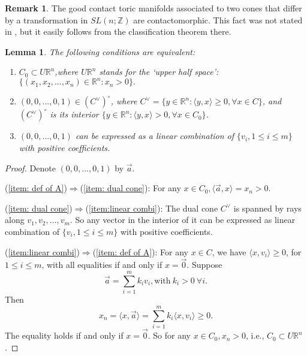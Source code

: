 \documentclass[12pt]{amsart}
\newtheorem{lemma}[theorem]{Lemma}
\theoremstyle{definition}
\newtheorem{remark}[theorem]{Remark}
\numberwithin{equation}{section}
\begin{document}
\begin{remark}
The good contact toric manifolds associated to two cones that differ
by a transformation in $SL(n;{{\mathbb{Z}}})$ are contactomorphic. This fact was
not stated in \cite{L:contact toric}, but it easily follows from the
classification theorem there.
\end{remark}

\begin{lemma}\label{lemma:equiva of Assu A}
The following conditions are equivalent: \begin{enumerate}
\item\label{item: def of A} $C_{0}\subset U{{\mathbb{R}}}^n$,where $U{{\mathbb{R}}}^n$ stands for the `upper half space': $\{(x_{1},x_{2},...,x_{n})\in
{{\mathbb{R}}}^n:x_{n}>0\}.$
\item\label{item: dual cone} $(0,0,...,0,1)\in (C^{\vee})^{\circ}$, where $C^{\vee}=\{y\in {{\mathbb{R}}}^n: \langle y, x\rangle \geq 0, \forall x\in
C\}$, and $(C^{\vee})^{\circ}$ is its interior $\{y\in {{\mathbb{R}}}^n: \langle
y, x\rangle > 0, \forall x\in C_{0}\}$.
\item\label{item:linear combi} $(0,0,...,0,1)$ can be expressed as a linear combination of $\{v_{i},1\leq i\leq
m\}$ with positive coefficients.
\end{enumerate}
\end{lemma}
\begin{proof}
Denote $(0,0,...,0,1)$ by $\vec{a}$.

(\ref{item: def of A})$\Rightarrow$(\ref{item: dual cone}): For any
$x\in C_{0}, \langle \vec{a}, x\rangle =x_{n}
> 0$.

(\ref{item: dual cone})$\Rightarrow$(\ref{item:linear combi}): The
dual cone $C^{\vee}$ is spanned by rays along
$v_{1},v_{2},...,v_{m}$. So any vector in the interior of it can be
expressed as linear combination of $\{v_{i},1\leq i\leq m\}$ with
positive coefficients.

(\ref{item:linear combi})$\Rightarrow$(\ref{item: def of A}): For
any $x\in C$, we have $\langle x, v_{i}\rangle \geq 0$, for $1\leq
i\leq m$, with all equalities if and only if $x=\vec{0}$. Suppose
\begin{equation*}
\vec{a}=\sum_{i=1}^{m}k_{i}v_{i}, \mbox{with}\ k_{i}>0\ \forall
i.\end{equation*} Then \begin{equation*}x_{n}=\langle x,
\vec{a}\rangle= \sum_{i=1}^{m}k_{i}\langle x, v_{i}\rangle \geq
0.\end{equation*} The equality holds if and only if $x=\vec{0}$. So
for any $x\in C_{0}, x_{n}>0$, i.e., $C_{0}\subset U{{\mathbb{R}}}^n$.
\end{proof}
\end{document}
